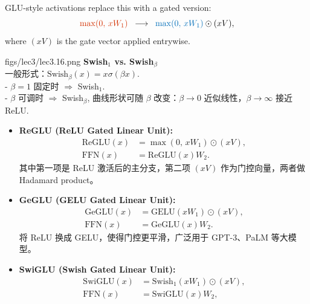 GLU-style activations replace this with a gated version:
\[
  {\color{tred}{\max(0,\,xW_1)}} 
  \;\;\longrightarrow\;\;
  {\color{dblue}{\max(0,\,xW_1)}} \odot (xV),
\]
where $(xV)$ is the gate vector applied entrywise.


\MarginImageWithNote
{figs/lec3/lec3.16.png}
{}
{
\textbf{Swish$_1$ vs. Swish$_\beta$}\\[0.3em]
一般形式：$\mathrm{Swish}_\beta(x)=x\sigma(\beta x)$.\\
- $\beta=1$ 固定时 $\Rightarrow$ Swish$_1$.\\
- $\beta$ 可调时 $\Rightarrow$ Swish$_\beta$, 曲线形状可随 $\beta$ 改变：$\beta\to0$ 近似线性，$\beta\to\infty$ 接近 ReLU.
}

\begin{itemize}
  \item \textbf{ReGLU (ReLU Gated Linear Unit):}
  \begin{align*}
    \mathrm{ReGLU}(x) &= \max(0,\, xW_1) \odot (xV), \\
    \mathrm{FFN}(x)   &= \mathrm{ReGLU}(x)W_2.
  \end{align*}
  其中第一项是 ReLU 激活后的主分支，第二项 $(xV)$ 作为门控向量，两者做 Hadamard product。

  \item \textbf{GeGLU (GELU Gated Linear Unit):}
  \begin{align*}
    \mathrm{GeGLU}(x) &= \mathrm{GELU}(xW_1) \odot (xV), \\
    \mathrm{FFN}(x)   &= \mathrm{GeGLU}(x)W_2.
  \end{align*}
  将 ReLU 换成 GELU，使得门控更平滑，广泛用于 GPT-3、PaLM 等大模型。

  \item \textbf{SwiGLU (Swish Gated Linear Unit):}
  \begin{align*}
    \mathrm{SwiGLU}(x) &= \mathrm{Swish_1}(xW_1) \odot (xV), \\
    \mathrm{FFN}(x)    &= \mathrm{SwiGLU}(x)W_2,
  \end{align*}
\end{itemize}




